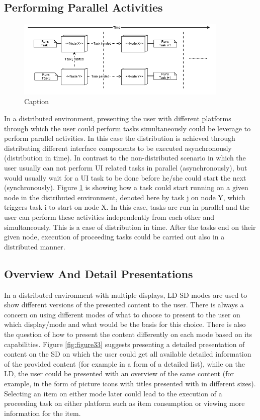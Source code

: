 \subsection{Performing Parallel Activities}
\begin{figure}[h]
\includegraphics[width=0.9\textwidth, inner, center]{generic2}
\caption{Caption}
\label{fig:figure32}
\end{figure}
In a distributed environment, presenting the user with different platforms through which the user could perform tasks simultaneously could be leverage to perform parallel activities. In this case the distribution is achieved through distributing different interface components to be executed asynchronously (distribution in time). In contrast to the non-distributed scenario in which the user usually can not perform UI related tasks in parallel (asynchronously), but would usually wait for a UI task to be done before he/she could start the next (synchronously). Figure \ref{fig:figure32} is showing how a task could start running on a given node in the distributed environment, denoted here by task j on node Y, which triggers task i to start on node X. In this case, tasks are run in parallel and the user can perform these activities independently from each other and simultaneously. This is a case of distribution in time. After the tasks end on their given node, execution of proceeding tasks could be carried out also in a distributed manner. 
\subsection{Overview And Detail Presentations}
In a distributed environment with multiple displays, LD-SD modes are used to show different versions of the presented content to the user. There is always a concern on using different modes of what to choose to present to the user on which display/mode and what would be the basis for this choice. There is also the question of how to present the content differently on each mode based on its capabilities. Figure \ref{fig:figure33} suggests presenting a detailed presentation  of content on the SD on which the user could get all available detailed information of the provided content (for example in a form of a detailed list), while on the LD, the user could be presented with an overview of the same content (for example, in the form of picture icons with titles presented with in different sizes). Selecting an item on either mode later could lead to the execution of a proceeding task on either platform such as item consumption or viewing more information for the item.      

